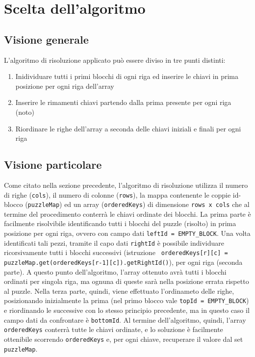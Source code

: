 %
%

\section{Scelta dell'algoritmo}

\subsection{Visione generale}
L'algoritmo di risoluzione applicato può essere diviso in tre punti distinti:
\begin{enumerate}
\item Inidividuare tutti i primi blocchi di ogni riga ed inserire le chiavi in prima posizione per ogni riga dell'array
\item Inserire le rimamenti chiavi partendo dalla prima presente per ogni riga (noto)
\item Riordinare le righe dell'array a seconda delle chiavi iniziali e finali per ogni riga
\end{enumerate}

\subsection{Visione particolare}
Come citato nella sezione precedente, l'algoritmo di risoluzione utilizza il numero di righe (\texttt{cols}), il numero di colonne (\texttt{rows}), la mappa contenente le coppie id-blocco (\texttt{puzzleMap}) ed un array (\texttt{orderedKeys}) di dimensione \texttt{rows x cols} che al termine del procedimento conterrà le chiavi ordinate dei blocchi. La prima parte è facilmente risolvibile identificando tutti i blocchi del puzzle (risolto) in prima posizione per ogni riga, ovvero con campo dati \texttt{leftId = EMPTY\_BLOCK}. Una volta identificati tali pezzi, tramite il capo dati \texttt{rightId} è possibile individuare ricorsivamente tutti i blocchi successivi (istruzione \texttt{ orderedKeys[r][c] = puzzleMap.get(orderedKeys[r-1][c]).getRightId()}), per ogni riga (seconda parte). A questo punto dell'algoritmo, l'array ottenuto avrà tutti i blocchi ordinati per singola riga, ma ognuna di queste sarà nella posizione errata rispetto al puzzle. Nella terza parte, quindi, viene effettuato l'ordinameto delle righe, posizionando inizialmente la prima (nel primo blocco vale \texttt{topId = EMPTY\_BLOCK}) e riordinando le successive con lo stesso principio precedente, ma in questo caso il campo dati da confrontare è \texttt{bottomId}. Al termine dell'algoritmo, quindi, l'array \texttt{orderedKeys} conterrà tutte le chiavi ordinate, e lo soluzione è facilmente ottenibile scorrendo \texttt{orderedKeys} e, per ogni chiave, recuperare il valore dal set \texttt{puzzleMap}.